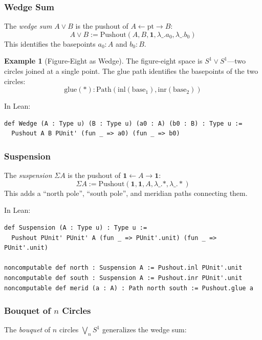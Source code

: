 \documentclass{lmcs}
\theoremstyle{definition}
\newtheorem{example}[definition]{Example}
\theoremstyle{plain}
\theoremstyle{remark}
\newcommand{\Path}{\mathrm{Path}}
\newcommand{\Pushout}{\mathrm{Pushout}}
\newcommand{\Wedge}{\vee}
\newcommand{\Susp}{\Sigma}
\newcommand{\inl}{\mathrm{inl}}
\newcommand{\inr}{\mathrm{inr}}
\newcommand{\glmark}{\mathrm{glue}}
\newcommand{\Sone}{S^1}
\begin{document}
\subsubsection{Wedge Sum}

The \emph{wedge sum} $A \Wedge B$ is the pushout of $A \leftarrow \mathrm{pt} \to B$:
\[
A \Wedge B := \Pushout(A, B, \mathbf{1}, \lambda\_.a_0, \lambda\_.b_0)
\]
This identifies the basepoints $a_0 : A$ and $b_0 : B$.

\begin{example}[Figure-Eight as Wedge]
\label{ex:figure-eight-wedge}
The figure-eight space is $\Sone \Wedge \Sone$---two circles joined at a single point. The glue path identifies the basepoints of the two circles:
\[
\glmark(*) : \Path(\inl(\mathrm{base}_1), \inr(\mathrm{base}_2))
\]
\end{example}

In Lean:
\begin{lstlisting}
def Wedge (A : Type u) (B : Type u) (a0 : A) (b0 : B) : Type u :=
  Pushout A B PUnit' (fun _ => a0) (fun _ => b0)
\end{lstlisting}

\subsubsection{Suspension}

The \emph{suspension} $\Susp A$ is the pushout of $\mathbf{1} \leftarrow A \to \mathbf{1}$:
\[
\Susp A := \Pushout(\mathbf{1}, \mathbf{1}, A, \lambda\_.*, \lambda\_.*)
\]
This adds a ``north pole'', ``south pole'', and meridian paths connecting them.

In Lean:
\begin{lstlisting}
def Suspension (A : Type u) : Type u :=
  Pushout PUnit' PUnit' A (fun _ => PUnit'.unit) (fun _ => PUnit'.unit)

noncomputable def north : Suspension A := Pushout.inl PUnit'.unit
noncomputable def south : Suspension A := Pushout.inr PUnit'.unit
noncomputable def merid (a : A) : Path north south := Pushout.glue a
\end{lstlisting}

\subsubsection{Bouquet of \texorpdfstring{$n$}{n} Circles}

The \emph{bouquet} of $n$ circles $\bigvee_n \Sone$ generalizes the wedge sum:
\end{document}
